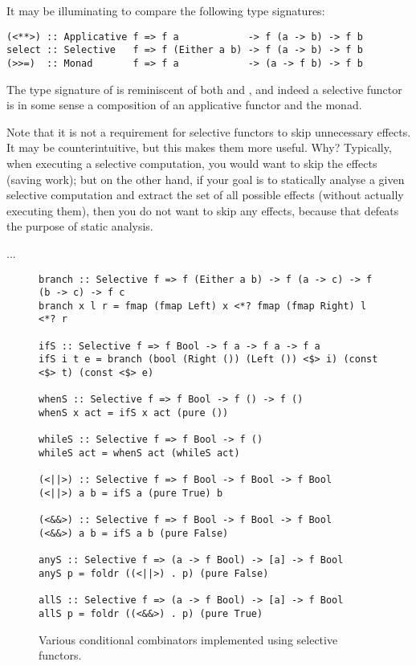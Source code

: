 It may be illuminating to compare the following type signatures:

\begin{verbatim}
(<**>) :: Applicative f => f a            -> f (a -> b) -> f b
select :: Selective   f => f (Either a b) -> f (a -> b) -> f b
(>>=)  :: Monad       f => f a            -> (a -> f b) -> f b
\end{verbatim}

The type signature of  is reminiscent of both \hs{<*>} and \hs{>>=},
and indeed a selective functor is in some sense a composition of an applicative
functor and the  monad.


Note that it is not a requirement for selective functors to skip unnecessary
effects. It may be counterintuitive, but this makes them more useful. Why?
Typically, when executing a selective computation, you would want to skip the
effects (saving work); but on the other hand, if your goal is to statically
analyse a given selective computation and extract the set of all possible
effects (without actually executing them), then you do not want to skip any
effects, because that defeats the purpose of static analysis.

...

\begin{figure}
\begin{verbatim}
branch :: Selective f => f (Either a b) -> f (a -> c) -> f (b -> c) -> f c
branch x l r = fmap (fmap Left) x <*? fmap (fmap Right) l <*? r

ifS :: Selective f => f Bool -> f a -> f a -> f a
ifS i t e = branch (bool (Right ()) (Left ()) <$> i) (const <$> t) (const <$> e)

whenS :: Selective f => f Bool -> f () -> f ()
whenS x act = ifS x act (pure ())

whileS :: Selective f => f Bool -> f ()
whileS act = whenS act (whileS act)

(<||>) :: Selective f => f Bool -> f Bool -> f Bool
(<||>) a b = ifS a (pure True) b

(<&&>) :: Selective f => f Bool -> f Bool -> f Bool
(<&&>) a b = ifS a b (pure False)

anyS :: Selective f => (a -> f Bool) -> [a] -> f Bool
anyS p = foldr ((<||>) . p) (pure False)

allS :: Selective f => (a -> f Bool) -> [a] -> f Bool
allS p = foldr ((<&&>) . p) (pure True)
\end{verbatim}
\caption{Various conditional combinators implemented using selective functors.}
\label{fig-library}
\end{figure}